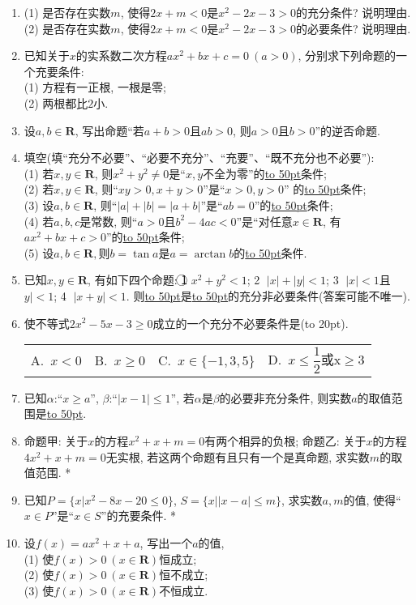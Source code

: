 \documentclass[10pt,a4paper]{article}
\newcommand{\blank}[1]{\underline{\hbox to #1pt{}}}
\newcommand{\bracket}[1]{(\hbox to #1pt{})}
\newcommand{\fourch}[4]{\par\begin{tabular}{p{.23\textwidth}p{.23\textwidth}p{.23\textwidth}p{.23\textwidth}}
A.~#1 &B.~#2& C.~#3& D.~#4
\end{tabular}}
\begin{document}
\begin{enumerate}[1.]
(5) 设$a_1,b_1,c_1,a_2,b_2,c_2$均为非零实数, 方程$a_1x^2+b_1x+c_1=0$和方程$a_2x^2+b_2x+c_2=0$的实数解集分别为$M$和$N$, 则``$\dfrac{a_1}{a_2}=\dfrac{b_1}{b_2}=\dfrac{c_1}{c_2}$''是``$M=N$''的\blank{50}条件.
\item (1) 是否存在实数$m$, 使得$2x+m<0$是${x^2}-2x-3>0$的充分条件? 说明理由.\\
(2) 是否存在实数$m$, 使得$2x+m<0$是$x^2-2x-3>0$的必要条件? 说明理由.
\item 已知关于$x$的实系数二次方程$a x^2 +bx+c=0\ (a>0)$, 分别求下列命题的一个充要条件:\\
(1) 方程有一正根, 一根是零;\\
(2) 两根都比$2$小.
\item 设$a,b\in \mathbf{R}$, 写出命题``若$a+b>0$且$ab>0$, 则$a>0$且$b>0$''的逆否命题.
\item 填空(填``充分不必要''、``必要不充分''、``充要''、``既不充分也不必要''):\\
(1) 若$x,y\in \mathbf{R}$, 则$x^2+y^2 \ne 0$是``$x,y$不全为零''的\blank{50}条件;\\
(2) 若$x,y$$\in \mathbf{R}$, 则``$xy>0,x+y>0$''是``$x>0,y>0$'' 的\blank{50}条件;\\
(3) 设$a,b\in \mathbf{R}$, 则``$|a|+|b|=|a+b|$''是``$ab=0$''的\blank{50}条件;\\   
(4) 若$a,b,c$是常数, 则``$a>0$且$b^2-4ac<0$''是``对任意$x\in \mathbf{R}$, 有$ax^2+bx+c>0$''的\blank{50}条件;\\
(5) 设$a,b\in \mathbf{R},$则$b=\tan a$是$a=\arctan b$的\blank{50}条件.
\item 已知$x,y\in \mathbf{R}$, 有如下四个命题: \textcircled{1} $x^2+y^2<1$; \textcircled{2} $|x|+|y|<1$; \textcircled{3} $|x|<1$且$y|<1$; \textcircled{4} $|x+y|<1$. 则\blank{50}是\blank{50}的充分非必要条件(答案可能不唯一).
\item 使不等式$2x^2-5x-3\ge 0$成立的一个充分不必要条件是\bracket{20}. 
\fourch{$x<0$}{$x\ge 0$}{$x\in \{-1,3,5\}$}{$x\le \dfrac12$或x$\ge 3$}
\item 已知$\alpha$:``$x\ge a$'', $\beta$:``$|x-1|\le 1$'', 若$\alpha$是$\beta$的必要非充分条件, 则实数$a$的取值范围是\blank{50}.
\item 命题甲: 关于$x$的方程$x^2+x+m=0$有两个相异的负根; 命题乙: 关于$x$的方程$4x^2+x+m=0$无实根, 若这两个命题有且只有一个是真命题, 求实数$m$的取值范围.
*\item 已知$P=\{x|x^2-8x-20 \le 0\}$, $S=\{x||x-a|\le m\}$, 求实数$a,m$的值, 使得``$x\in P$''是``$x\in S$''的充要条件.
*\item 设$f(x)=ax^2+x+a$, 写出一个$a$的值,\\
(1) 使$f(x)>0\ (x\in \mathbf{R})$恒成立;\\
(2) 使$f(x)>0\ (x\in \mathbf{R})$恒不成立;\\
(3) 使$f(x)>0\ (x\in \mathbf{R})$不恒成立. 


\end{enumerate}
\end{document}
